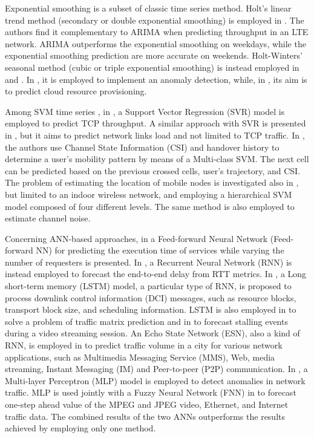 Exponential smoothing \cite{Holt2004} is a subset of classic time series method. Holt's linear trend method (secondary or double exponential smoothing) is employed in \cite{dong2015}. The authors find it complementary to ARIMA when predicting throughput in an LTE network. ARIMA outperforms the exponential smoothing on weekdays, while the exponential smoothing prediction are more accurate on weekends.
Holt-Winters' seasonal method (cubic or triple exponential smoothing) is instead employed in \cite{Szmit2012} and \cite{Shahin2017}. In \cite{Szmit2012}, it is employed to implement an anomaly detection, while, in \cite{Shahin2017}, its aim is to predict cloud resource provisioning.


Among SVM time series \cite{Muller1997}, in \cite{Mirza2010}, a Support Vector Regression (SVR) model is employed to predict TCP throughput. A similar approach with SVR is presented in \cite{Bermolen2009}, but it aims to predict network links load and not limited to TCP traffic.
In \cite{Chen2013}, the authors use Channel State Information (CSI) and handover history to determine a user’s mobility pattern by means of a Multi-class SVM. The next cell can be predicted based on the previous crossed cells, user's trajectory, and CSI. The problem of estimating the location of mobile nodes is investigated also in \cite{Feng2011}, but limited to an indoor wireless network, and employing a hierarchical SVM model composed of four different levels. The same method is also employed to estimate channel noise.

Concerning ANN-based approaches, in \cite{zadeh2010} a Feed-forward Neural Network (Feed-forward NN) for predicting the execution time of services while varying the number of requesters is presented. In \cite{belhaj2009}, a Recurrent Neural Network (RNN) is instead employed to forecast the end-to-end delay from RTT metrics.
In \cite{trinh2018}, a Long short-term memory (LSTM) model, a particular type of RNN, is proposed to process downlink control information (DCI) messages, such as resource blocks, transport block size, and scheduling information.
LSTM is also employed in \cite{Azzouni2018} to solve a problem of traffic matrix prediction and in \cite{martinez2021identification} to forecast stalling events during a video streaming session.
An Echo State Network (ESN), also a kind of RNN, is employed in \cite{Cui2014} to predict traffic volume in a city for various network applications, such as Multimedia Messaging Service (MMS), Web, media streaming, Instant Messaging (IM) and Peer-to-peer (P2P) communication.
In \cite{Szmit2012}, a Multi-layer Perceptron (MLP) model is employed to detect anomalies in network traffic. MLP is used jointly with a Fuzzy Neural Network (FNN) in \cite{Khotanzad2003} to forecast one-step ahead value of the MPEG and JPEG video, Ethernet, and Internet traffic data. The combined results of the two ANNs outperforms the results achieved by employing only one method.

